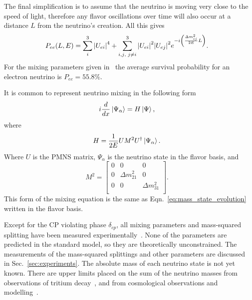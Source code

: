 The final simplification is to assume that the neutrino is moving very close
to the speed of light, therefore any flavor oscillations over time will also
occur at a distance $L$ from the neutrino's creation.
All this gives
\begin{equation}
    \label{eqn:pee_adiabatic}
    P_{ee}(L,E) = \sum_{i}^{3}\abs{U_{ei}}^4 +
    \sum_{i,j\text{, }j \ne i}^{3}
    \abs{U_{ei}}^2\abs{U_{ej}}^2e^{-i\left(\frac{\Delta m^{2}_{ij}}{2E}L\right)}\text{.}
\end{equation}
For the mixing parameters given in~\citep{pdg16} the average survival probability
for an electron neutrino is $P_{ee} = 55.8\%$.

It is common to represent neutrino mixing in the following form
\begin{equation}
i\frac{d}{dx}\ket{\Psi_{\alpha}} = H\ket{\Psi}\text{,}
\label{eq:mixing_hamiltonian}
\end{equation}
where
\begin{equation}
    H = \frac{1}{2E}UM^{2}U^{\dagger}\ket{\Psi_{\alpha}}\text{.}
\end{equation}
Where $U$ is the PMNS matrix, $\Psi_{\alpha}$ is the neutrino state in the  flavor
basis, and
\begin{equation}
M^{2} = 
\begin{bmatrix}
    0 & 0 & 0  \\
    0 & \Delta m^{2}_{21} & 0  \\
    0 & 0 & \Delta m^{2}_{31}  \\
\end{bmatrix}\text{.}
\end{equation}
This form of the mixing equation is the same as Eqn.~\eqref{eq:mass_state_evolution}
written in the flavor basis.


Except for the CP violating phase $\delta_{cp}$, all mixing
parameters and mass-squared splitting have been measured experimentally~\citep{pdg_globalfit}.
None of the parameters are predicted in the standard model, so they are theoretically
unconstrained.
The measurements of the mass-squared splittings and
other parameters are discussed in Sec.~\ref{sec:experiments}.
The absolute mass of each neutrino state is not yet known.
There are upper limits placed on the sum of the neutrino masses from
observations of tritium decay~\citep{troitsk_mass}, and from cosmological
observations and modelling~\citep{cosmological_neutrino_mass}.

